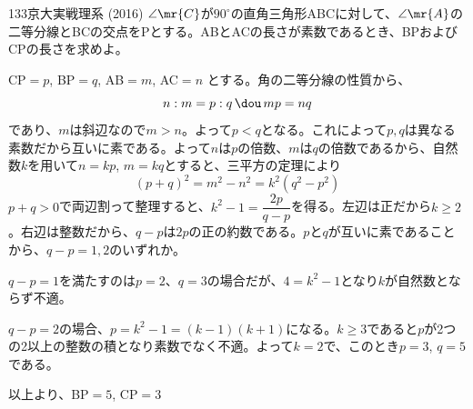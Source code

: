 \begin{prob}{133}{\maru}{京大実戦理系 (2016)}
 $\angle\mr{C}$が$90^\circ$の直角三角形ABCに対して、$\angle\mr{A}$の二等分線とBCの交点をPとする。ABとACの長さが素数であるとき、BPおよびCPの長さを求めよ。
\end{prob}

CP$=p$, BP$=q$, AB$=m$, AC$=n$ とする。角の二等分線の性質から、
\[ n:m=p:q \,\dou\, mp=nq \]
であり、$m$は斜辺なので$m>n$。よって$p<q$となる。これによって$p, q$は異なる素数だから互いに素である。よって$n$は$p$の倍数、$m$は$q$の倍数であるから、自然数$k$を用いて$n=kp$, $m=kq$とすると、三平方の定理により
\[ (p+q)^2=m^2-n^2=k^2(q^2-p^2) \]
$p+q>0$で両辺割って整理すると、$k^2-1=\dfrac{2p}{q-p}$を得る。左辺は正だから$k\ge 2$。右辺は整数だから、$q-p$は$2p$の正の約数である。$p$と$q$が互いに素であることから、$q-p=1, 2$のいずれか。

$q-p=1$を満たすのは$p=2$、$q=3$の場合だが、$4=k^2-1$となり$k$が自然数とならず不適。

$q-p=2$の場合、$p=k^2-1=(k-1)(k+1)$になる。$k\ge 3$であると$p$が2つの2以上の整数の積となり素数でなく不適。よって$k=2$で、このとき$p=3$, $q=5$である。

以上より、BP$=5$, CP$=3$